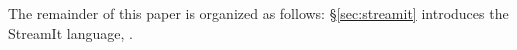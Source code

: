 The remainder of this paper is organized as follows:
\S\ref{sec:streamit} introduces the StreamIt language, .








